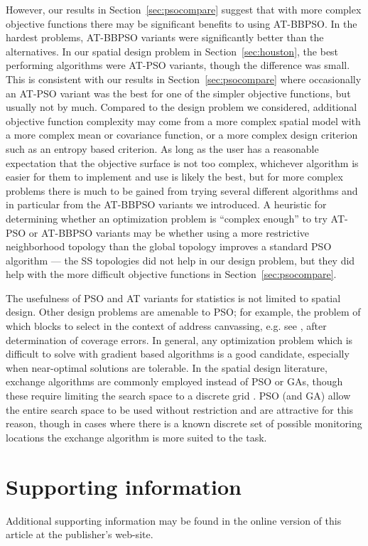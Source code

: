 \documentclass[cmbright]{staauth}
\begin{document}
However, our results in Section~\ref{sec:psocompare} suggest that with more complex objective functions there may be significant benefits to using AT-BBPSO. In the hardest problems, AT-BBPSO variants were significantly better than the alternatives. In our spatial design problem in Section~\ref{sec:houston}, the best performing algorithms were AT-PSO variants, though the difference was small. This is consistent with our results in Section~\ref{sec:psocompare} where occasionally an AT-PSO variant was the best for one of the simpler objective functions, but usually not by much. Compared to the design problem we considered, additional objective function complexity may come from a more complex spatial model with a more complex mean or covariance function, or a more complex design criterion such as an entropy based criterion. As long as the user has a reasonable expectation that the objective surface is not too complex, whichever algorithm is easier for them to implement and use is likely the best, but for more complex problems there is much to be gained from trying several different algorithms and in particular from the AT-BBPSO variants we introduced. A heuristic for determining whether an optimization problem is ``complex enough'' to try AT-PSO or AT-BBPSO variants may be whether using a more restrictive neighborhood topology than the global topology improves a standard PSO algorithm --- the SS topologies did not help in our design problem, but they did help with the more difficult objective functions in Section~\ref{sec:psocompare}.

The usefulness of PSO and AT variants for statistics is not limited to spatial design. Other design problems are amenable to PSO; for example, the problem of which blocks to select in the context of address canvassing, e.g. see \cite{young2016zero}, after determination of coverage errors. In general, any optimization problem which is difficult to solve with gradient based algorithms is a good candidate, especially when near-optimal solutions are tolerable. In the spatial design literature, exchange algorithms are commonly employed instead of PSO or GAs, though these require limiting the search space to a discrete grid \citep{nychka1998design,wikle1999space,wikle2005dynamic}. PSO (and GA) allow the entire search space to be used without restriction and are attractive for this reason, though in cases where there is a known discrete set of possible monitoring locations the exchange algorithm is more suited to the task.





\section{Supporting information}
Additional supporting information may be found in the online version of this article at the publisher's web-site.
\end{document}

